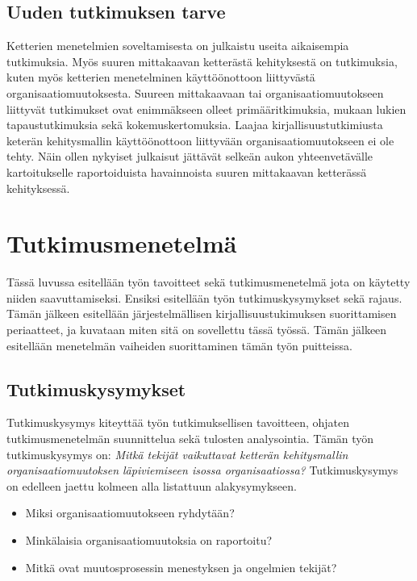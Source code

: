 \subsection{Uuden tutkimuksen tarve}
Ketterien menetelmien soveltamisesta on julkaistu useita aikaisempia
tutkimuksia. Myös suuren mittakaavan ketterästä kehityksestä on tutkimuksia,
kuten myös ketterien menetelminen käyttöönottoon liittyvästä
organisaatiomuutoksesta. Suureen mittakaavaan tai organisaatiomuutokseen
liittyvät tutkimukset ovat enimmäkseen olleet primääritkimuksia, mukaan lukien
tapaustutkimuksia sekä kokemuskertomuksia. Laajaa kirjallisuustutkimiusta
keterän kehitysmallin käyttöönottoon liittyvään organisaatiomuutokseen ei ole
tehty. Näin ollen nykyiset julkaisut jättävät selkeän aukon yhteenvetävälle
kartoitukselle raportoiduista havainnoista suuren mittakaavan ketterässä
kehityksessä.


\section{Tutkimusmenetelmä}
\label{sec:menetelma}

Tässä luvussa esitellään työn tavoitteet sekä tutkimusmenetelmä jota on käytetty
niiden saavuttamiseksi. Ensiksi esitellään työn tutkimuskysymykset sekä rajaus.
Tämän jälkeen esitellään järjestelmällisen kirjallisuustukimuksen suorittamisen
periaatteet, ja kuvataan miten sitä on sovellettu tässä työssä. Tämän jälkeen
esitellään menetelmän vaiheiden suorittaminen tämän työn puitteissa.

\subsection{Tutkimuskysymykset}
Tutkimuskysymys kiteyttää työn tutkimuksellisen tavoitteen, ohjaten
tutkimusmenetelmän suunnittelua sekä tulosten analysointia. Tämän työn
tutkimuskysymys on: \textit{Mitkä tekijät vaikuttavat ketterän kehitysmallin
organisaatiomuutoksen läpiviemiseen isossa organisaatiossa?} Tutkimuskysymys on
edelleen jaettu kolmeen alla listattuun alakysymykseen.

\begin{itemize}
\item Miksi organisaatiomuutokseen ryhdytään?
\item Minkälaisia organisaatiomuutoksia on raportoitu?
\item Mitkä ovat muutosprosessin menestyksen ja ongelmien tekijät?
\end{itemize}

